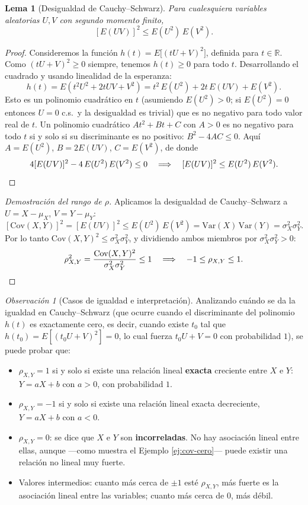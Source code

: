 \documentclass[11pt,a4paper]{article}
\theoremstyle{plain}
\newtheorem{lema}[teorema]{Lema}
\theoremstyle{definition}
\theoremstyle{remark}
\newtheorem{observacion}[teorema]{Observación}
\begin{document}
\begin{lema}[Desigualdad de Cauchy--Schwarz]
Para cualesquiera variables aleatorias $U,V$ con segundo momento finito,
\[
[E(UV)]^2 \leq E(U^2)\,E(V^2).
\]
\end{lema}

\begin{proof}
Consideremos la función $h(t) = E\big[(tU+V)^2\big]$, definida para $t\in\mathbb{R}$. Como $(tU+V)^2\geq 0$ siempre, tenemos $h(t)\geq 0$ para todo $t$. Desarrollando el cuadrado y usando linealidad de la esperanza:
\[
h(t) = E(t^2U^2 + 2tUV + V^2) = t^2\,E(U^2) + 2t\,E(UV) + E(V^2).
\]
Esto es un polinomio cuadrático en $t$ (asumiendo $E(U^2)>0$; si $E(U^2)=0$ entonces $U=0$ c.s.\ y la desigualdad es trivial) que es no negativo para todo valor real de $t$. Un polinomio cuadrático $At^2+Bt+C$ con $A>0$ es no negativo para todo $t$ si y solo si su discriminante es no positivo: $B^2-4AC\leq 0$. Aquí $A=E(U^2)$, $B=2E(UV)$, $C=E(V^2)$, de donde
\[
4[E(UV)]^2 - 4\,E(U^2)\,E(V^2) \leq 0 \quad\Longrightarrow\quad [E(UV)]^2 \leq E(U^2)\,E(V^2). \qedhere
\]
\end{proof}

\begin{proof}[Demostración del rango de $\rho$]
Aplicamos la desigualdad de Cauchy--Schwarz a $U=X-\mu_X$, $V=Y-\mu_Y$:
\[
[\text{Cov}(X,Y)]^2 = [E(UV)]^2 \leq E(U^2)\,E(V^2) = \text{Var}(X)\,\text{Var}(Y) = \sigma_X^2\sigma_Y^2.
\]
Por lo tanto $\text{Cov}(X,Y)^2 \leq \sigma_X^2\sigma_Y^2$, y dividiendo ambos miembros por $\sigma_X^2\sigma_Y^2>0$:
\[
\rho_{X,Y}^2 = \frac{\text{Cov}(X,Y)^2}{\sigma_X^2\sigma_Y^2} \leq 1 \quad\Longrightarrow\quad -1\leq \rho_{X,Y}\leq 1. \qedhere
\]
\end{proof}

\begin{observacion}[Casos de igualdad e interpretación]
Analizando cuándo se da la igualdad en Cauchy--Schwarz (que ocurre cuando el discriminante del polinomio $h(t)$ es exactamente cero, es decir, cuando existe $t_0$ tal que $h(t_0)=E[(t_0 U+V)^2]=0$, lo cual fuerza $t_0 U+V=0$ con probabilidad $1$), se puede probar que:
\begin{itemize}
\item $\rho_{X,Y}=1$ si y solo si existe una relación lineal \textbf{exacta} creciente entre $X$ e $Y$: $Y=aX+b$ con $a>0$, con probabilidad $1$.
\item $\rho_{X,Y}=-1$ si y solo si existe una relación lineal exacta decreciente, $Y=aX+b$ con $a<0$.
\item $\rho_{X,Y}=0$: se dice que $X$ e $Y$ son \textbf{incorreladas}. No hay asociación lineal entre ellas, aunque —como muestra el Ejemplo \ref{ej:cov-cero}— puede existir una relación no lineal muy fuerte.
\item Valores intermedios: cuanto más cerca de $\pm1$ esté $\rho_{X,Y}$, más fuerte es la asociación lineal entre las variables; cuanto más cerca de $0$, más débil.
\end{itemize}
\end{observacion}
\end{document}
